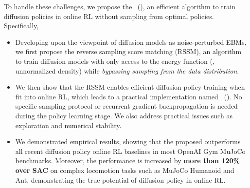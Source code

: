 To handle these challenges, we propose the \algname~(\algabb), an efficient algorithm to train diffusion policies in online RL without sampling from optimal policies. 
Specifically, 
\begin{itemize}[leftmargin=10pt, parsep=5pt]
    \item Developing upon the viewpoint of diffusion models as noise-perturbed EBMs, we first propose the reverse sampling score matching (RSSM), an algorithm to train diffusion models with only access to the energy function (\ie, unnormalized density) while \emph{bypassing sampling from the data distribution}.
    \item We then show that the RSSM enables efficient diffusion policy training when fit into online RL, which leads to a practical implementation named \algname~(\algabb). No specific sampling protocol or recurrent gradient backpropagation is needed during the policy learning stage. 
    We also address practical issues such as exploration and numerical stability.
    \item We demonstrated empirical results, showing that the proposed \algabb outperforms all recent diffusion policy online RL baselines in most OpenAI Gym MuJoCo benchmarks. Moreover, the performance is increased by \textbf{more than 120\% over SAC} on complex locomotion tasks such as MuJoCo Humanoid and Ant, demonstrating the true potential of diffusion policy in online RL.
\end{itemize}

 

